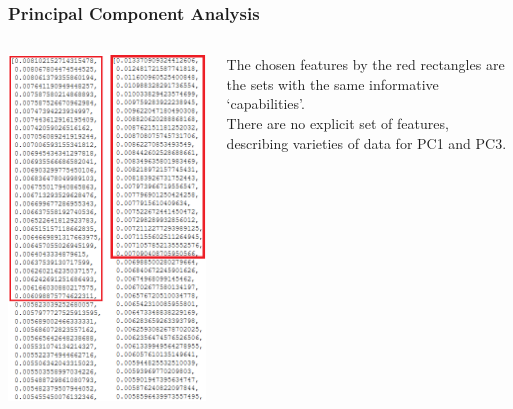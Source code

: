 \documentclass[10pt,dvipsnames]{beamer}
\begin{document}
\begin{frame}
  \frametitle{Principal Component Analysis}
  \begin{columns}
    \begin{column}{0.4\linewidth}
      \includegraphics[width=\linewidth]{pics/pcas.png}
    \end{column}
    \begin{column}{0.6\linewidth}
      The chosen features by the red rectangles are the sets with the same informative `capabilities'.\\[1em]

      There are no explicit set of features, describing varieties of data for PC1 and PC3.
    \end{column}
  \end{columns}
\end{frame}
\end{document}
